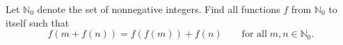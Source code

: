 Let $ \mathbb{N}_0$ denote the set of nonnegative integers. Find all  functions $ f$ from $ \mathbb{N}_0$ to itself such that
\[ f(m + f(n)) = f(f(m)) + f(n)\qquad \text{for all} \; m, n \in \mathbb{N}_0.\]
